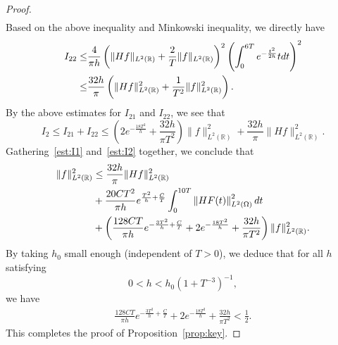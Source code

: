 \documentclass[a4paper,reqno]{amsart}
\theoremstyle{definition}
\numberwithin{equation}{section}
\newcommand{\R}{\mathbb{R}}
\def \R {{\mathbb{R} }}
\def \d {{\rm{d}}}
\begin{document}
\begin{proof}
\begin{equation*}
\begin{aligned}
        \end{aligned}
        \end{equation*}
        Based on the above inequality and Minkowski inequality, we directly have 
        \begin{equation*}
        	\begin{split}
 I_{22}\le &
   \frac{4}{\pi h}\left(\|Hf\|_{L^2(\R)}+\frac{2}{T}\|f\|_{L^2(\R)} \right)^{2}\left(\int_{0}^{6T}e^{-\frac{t^{2}}{2h}}t\d t\right)^{2} 
		\\ \le 
            &
            \frac{32h}{\pi}\left(\|Hf\|_{L^2(\R)}^2+\frac{1}{T^{2}}\|f\|_{L^2(\R)}^2\right).
            \end{split}
            \end{equation*}
            By the above estimates for $I_{21}$ and $I_{22}$, we see that 
            \begin{equation}\label{est:I2}
                I_{2}\le I_{21}+I_{22}\le \left(2e^{-\frac{18T^{2}}{h}}+
                		\frac{32h}{\pi T^2}
                		\right )\|f\|_{L^{2}(\R)}^{2}+\frac{32h}{\pi}\|Hf\|_{L^{2}(\R)}^{2}. 
                \end{equation}
                Gathering~\eqref{est:I1} and~\eqref{est:I2} together, we conclude that 
                \begin{equation*}
                \begin{aligned}
                \|f\|_{L^{2}(\R)}^{2}
                &\le \frac{32h}{\pi}\|Hf\|_{L^{2}(\R)}^{2} \\                
                &+
                \frac{20CT^{2}}{{\pi h}}e^{\frac{T^{2}}{h}+\frac{C}{T}}\int_{0}^{10T}\left\|HF(t)\right\|_{L^{2}(\Omega)}^{2}\d t\\
                &+\left(\frac{128CT}{{\pi h}}e^{-\frac{3T^{2}}{h}+\frac{C}{T}}+2e^{-\frac{18T^{2}}{h}}+\frac{32h}{\pi T^2} \right)\|f\|_{L^{2}(\R)}^{2}.
                       \end{aligned}
                \end{equation*}
                	 				 By taking $h_{0}$ small enough (independent of $T>0$), we deduce that for all $h$  satisfying $$0<h<h_{0}(1+T^{-3})^{-1},$$
                	 				 we have
                 \begin{align*}
                  \frac{128CT}{\pi h}e^{-\frac{3T^2}{h}+\frac{C}{T}}+2e^{-\frac{18T^2}{h}}+\frac{32h}{\pi T^2}
                 <\frac{1}{2}.
                   \end{align*}
                 This completes the proof of Proposition~\ref{prop:key}.
\end{proof}
\end{document}
